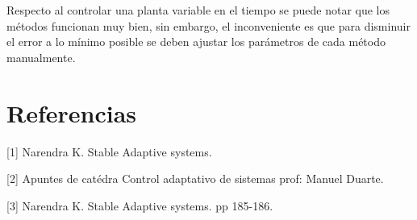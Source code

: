\documentclass[letterpaper,11pt]{article} %
\begin{document}
Respecto al controlar una planta variable en el tiempo se puede notar que los métodos funcionan muy bien, sin embargo, el inconveniente es que para disminuir el error a lo mínimo posible se deben ajustar los parámetros de cada método manualmente. 



\newpage
\section*{Referencias}
[1] Narendra K. Stable Adaptive systems.

[2] Apuntes de catédra Control adaptativo de sistemas prof: Manuel Duarte.

[3] Narendra K. Stable Adaptive systems. pp 185-186.


\end{document}
